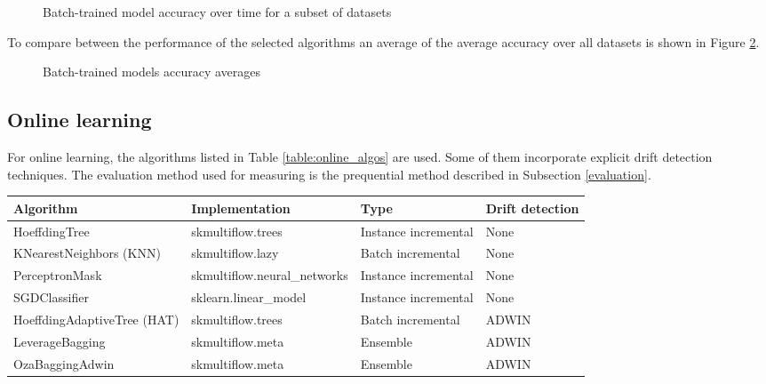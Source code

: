 \documentclass{sig-alternate-br}
\begin{document}
\begin{figure}[h]
\centering 
{}
\caption{Batch-trained model accuracy over time for a subset of datasets}
\label{fig:batchdt}
\end{figure}

To compare between the performance of the selected algorithms an average of the average accuracy over all datasets is shown in Figure \ref{fig:batch_violins}.

\vspace{3cm}

\begin{figure}[h]
\centering 
{}
\caption{Batch-trained models accuracy averages}
\label{fig:batch_violins}
\end{figure}

\subsection{Online learning}

For online learning, the algorithms listed in Table \ref{table:online_algos} are used. Some of them incorporate explicit drift detection techniques. The evaluation method used for measuring is the prequential method described in Subsection \ref{evaluation}.

\begin{table*}[h]
\centering
\renewcommand{\arraystretch}{1.25}
\begin{tabular}{|l|l|l|l|} \hline
\textbf{Algorithm} & \textbf{Implementation} & \textbf{Type}  & \textbf{Drift detection} \\ \hline
HoeffdingTree & skmultiflow.trees &  Instance incremental & None \\ \hline
KNearestNeighbors (KNN) & skmultiflow.lazy & Batch incremental & None \\ \hline
PerceptronMask & skmultiflow.neural\_networks & Instance incremental & None \\ \hline
SGDClassifier & sklearn.linear\_model & Instance incremental &  None \\ \hline
HoeffdingAdaptiveTree (HAT) & skmultiflow.trees & Batch incremental & ADWIN \\ \hline
LeverageBagging  & skmultiflow.meta & Ensemble &  ADWIN \\ \hline
OzaBaggingAdwin & skmultiflow.meta & Ensemble & ADWIN \\ \hline
\end{tabular}
\caption{Classifiers used for online learning}
\label{table:online_algos}
\end{table*}
\end{document}
